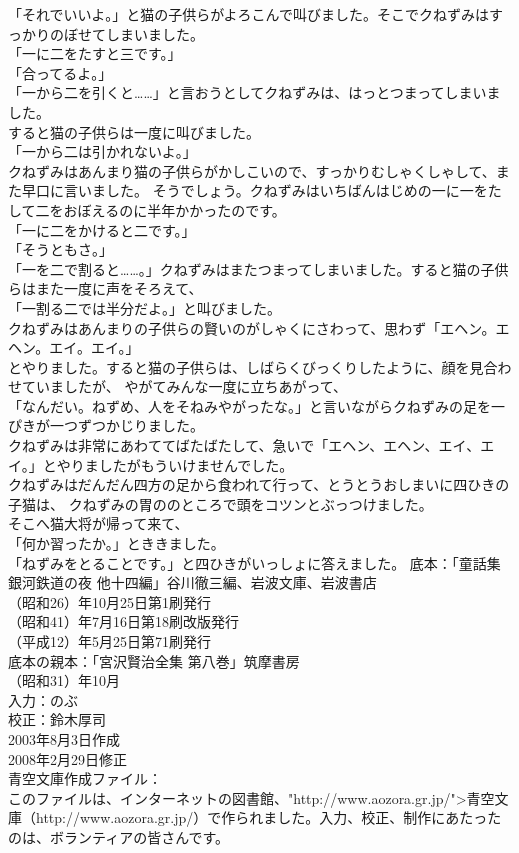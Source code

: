 \documentclass[
    a4paper,
    10pt,
    book]
    {tarticle}
\begin{document}
\newpage
\thispagestyle{fancy}
\fancyhead[R]{\empty}
「それでいいよ。」と猫の子供らがよろこんで叫びました。そこでクねずみはすっかりのぼせてしまいました。\\
「一に二をたすと三です。」\\
「合ってるよ。」\\
「一から二を引くと……」と言おうとしてクねずみは、はっとつまってしまいました。\\
\indent すると猫の子供らは一度に叫びました。\\
「一から二は引かれないよ。」\\
\indent クねずみはあんまり猫の子供らがかしこいので、すっかりむしゃくしゃして、また早口に言いました。
そうでしょう。クねずみはいちばんはじめの一に一をたして二をおぼえるのに半年かかったのです。\\
「一に二をかけると二です。」\\
「そうともさ。」\\
「一を二で割ると……。」クねずみはまたつまってしまいました。すると猫の子供らはまた一度に声をそろえて、\\
「一割る二では半分だよ。」と叫びました。\\
\indent クねずみはあんまりの子供らの賢いのがしゃくにさわって、思わず「エヘン。エヘン。エイ。エイ。」\\
とやりました。すると猫の子供らは、しばらくびっくりしたように、顔を見合わせていましたが、
\newpage
\thispagestyle{fancy}
\fancyhead[R]{\empty}
やがてみんな一度に立ちあがって、\\
「なんだい。ねずめ、人をそねみやがったな。」と言いながらクねずみの足を一ぴきが一つずつかじりました。\\
\indent クねずみは非常にあわててばたばたして、急いで「エヘン、エヘン、エイ、エイ。」とやりましたがもういけませんでした。\\
\indent クねずみはだんだん四方の足から食われて行って、とうとうおしまいに四ひきの子猫は、
クねずみの胃ののところで頭をコツンとぶっつけました。\\
\indent そこへ猫大将が帰って来て、\\
「何か習ったか。」とききました。\\
「ねずみをとることです。」と四ひきがいっしょに答えました。
\newpage
\nolinenumbers
底本：「童話集 銀河鉄道の夜 他十四編」谷川徹三編、岩波文庫、岩波書店
\\
（昭和26）年10月25日第1刷発行\\
（昭和41）年7月16日第18刷改版発行\\
（平成12）年5月25日第71刷発行\\
底本の親本：「宮沢賢治全集 第八巻」筑摩書房\\
（昭和31）年10月\\
入力：のぶ\\
校正：鈴木厚司\\
2003年8月3日作成\\
2008年2月29日修正\\
青空文庫作成ファイル：\\
このファイルは、インターネットの図書館、"http://www.aozora.gr.jp/">青空文庫（http://www.aozora.gr.jp/）で作られました。入力、校正、制作にあたったのは、ボランティアの皆さんです。\\
\\
\begin{comment}
\end{comment}
\end{document}
